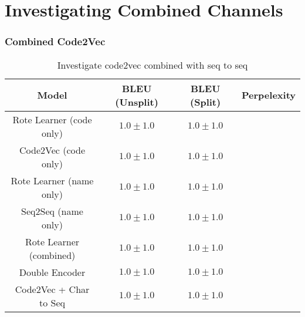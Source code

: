 \section{Investigating Combined Channels} %
\label{sec:investigating_combined_channels}

\subsubsection{Combined Code2Vec } %
\label{ssub:comparing_code2vec_altered}


\begin{table}[h!]
\begin{center}
\begin{tabular}{ c | c | c | c }
    Model                             & BLEU (Unsplit)  & BLEU (Split)    & Perpelexity \\
    \hline
    Rote Learner  (code only)                    & $1.0 \pm 1.0 $  & $1.0 \pm 1.0 $  &  \\
    Code2Vec  (code only)                    & $1.0 \pm 1.0 $  & $1.0 \pm 1.0 $  &  \\
    \hline
    \hline
    Rote Learner  (name only)                    & $1.0 \pm 1.0 $  & $1.0 \pm 1.0 $  &  \\
    Seq2Seq  (name only)                    & $1.0 \pm 1.0 $  & $1.0 \pm 1.0 $  &  \\
    \hline
    \hline
    Rote Learner (combined)           & $1.0 \pm 1.0 $  & $1.0 \pm 1.0 $  & \\
    Double Encoder                          & $1.0 \pm 1.0 $  & $1.0 \pm 1.0 $  &  \\
    Code2Vec  + Char to Seq                           & $1.0 \pm 1.0 $  & $1.0 \pm 1.0 $  &  \\
    \hline
\end{tabular}
\caption {Investigate code2vec combined with seq to seq}
\label{table:name_baseline}
\end{center}
\end{table}




